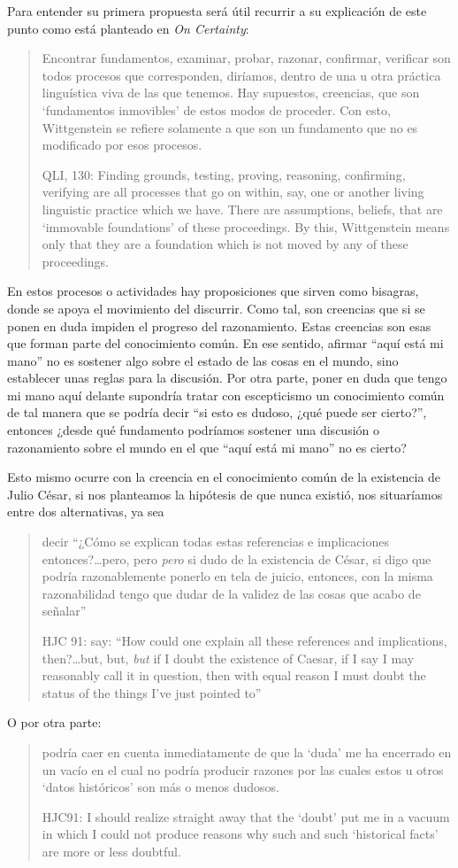 Para entender su primera propuesta será útil recurrir a su explicación de este
punto como está planteado en \emph{On Certainty}: \blockquote[QLI, 130: Finding
grounds, testing, proving, reasoning, confirming, verifying are all processes
that go on within, say, one or another living linguistic practice which we have.
There are assumptions, beliefs, that are ‘immovable foundations’ of these
proceedings. By this, Wittgenstein means only that they are a foundation which
is not moved by any of these proceedings.]{Encontrar fundamentos, examinar,
  probar, razonar, confirmar, verificar son todos procesos que corresponden,
  diríamos, dentro de una u otra práctica linguística viva de las que tenemos.
  Hay supuestos, creencias, que son `fundamentos inmovibles' de estos modos de
  proceder. Con esto, Wittgenstein se refiere solamente a que son un fundamento
  que no es modificado por esos procesos.} En estos procesos o actividades hay
proposiciones que sirven como bisagras, donde se apoya el movimiento del
discurrir. Como tal, son creencias que si se ponen en duda impiden el progreso
del razonamiento. Estas creencias son esas que forman parte del conocimiento
común. En ese sentido, afirmar \enquote{aquí está mi mano} no es sostener algo
sobre el estado de las cosas en el mundo, sino establecer unas reglas para la
discusión. Por otra parte, poner en duda que tengo mi mano aquí delante
supondría tratar con escepticismo un conocimiento común de tal manera que se
podría decir \enquote{si esto es dudoso, ¿qué puede ser cierto?}, entonces
¿desde qué fundamento podríamos sostener una discusión o razonamiento sobre el
mundo en el que \enquote{aquí está mi mano} no es cierto?

Esto mismo ocurre con la creencia en el conocimiento común de la existencia de
Julio César, si nos planteamos la hipótesis de que nunca existió, nos
situaríamos entre dos alternativas, ya sea \blockquote[HJC 91: \textelp{} say:
``How could one explain all these references and implications, then?\ldots but,
but, \emph{but} if I doubt the existence of Caesar, if I say I may reasonably
call it in question, then with equal reason I must doubt the status of the
things I've just pointed to'']{\textelp{} decir ``¿Cómo se explican todas estas
  referencias e implicaciones entonces?\ldots pero, pero \emph{pero} si dudo de
  la existencia de César, si digo que podría razonablemente ponerlo en tela de
  juicio, entonces, con la misma razonabilidad tengo que dudar de la validez de
  las cosas que acabo de señalar''}. O por otra parte: \blockquote[HJC91:
\textelp{} I should realize straight away that the `doubt' put me in a vacuum in
which I could not produce reasons why such and such `historical facts' are more
or less doubtful.]{\textelp{} podría caer en cuenta inmediatamente de que la
  `duda' me ha encerrado en un vacío en el cual no podría producir razones por
  las cuales estos u otros `datos históricos' son más o menos dudosos.}


